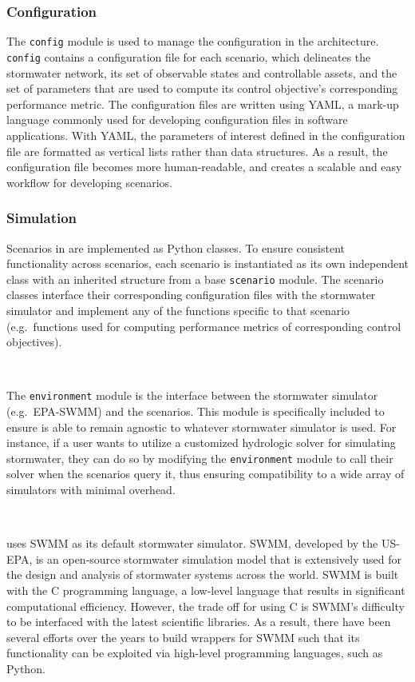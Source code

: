 \subsubsection{Configuration}
%
%
%
The \texttt{config} module is used to manage the configuration in the \pystorms architecture. \texttt{config} contains a configuration file for each scenario, which delineates the stormwater network, its set of observable states and controllable assets, and the set of parameters that are used to compute its control objective's corresponding performance metric. The configuration files are written using YAML, a mark-up language commonly used for developing configuration files in software applications. With YAML, the parameters of interest defined in the configuration file are formatted as vertical lists rather than data structures. As a result, the configuration file becomes more human-readable, and creates a scalable and easy workflow for developing scenarios. 
%
%
%
\subsubsection{Simulation}
%
%
%
Scenarios in \pystorms are implemented as Python classes. To ensure consistent functionality across scenarios, each scenario is instantiated as its own independent class with an inherited structure from a base \texttt{scenario} module. The scenario classes interface their corresponding configuration files with the stormwater simulator and implement any of the functions specific to that scenario (e.g.\ functions used for computing performance metrics of corresponding control objectives).

\

The \texttt{environment} module is the interface between the stormwater simulator (e.g.\ EPA-SWMM) and the scenarios. This module is specifically included to ensure \pystorms is able to remain agnostic to whatever stormwater simulator is used. For instance, if a user wants to utilize a customized hydrologic solver for simulating stormwater, they can do so by modifying the \texttt{environment} module to call their solver when the scenarios query it, thus ensuring compatibility to a wide array of simulators with minimal overhead. 

\

\pystorms uses SWMM as its default stormwater simulator. SWMM, developed by the US-EPA, is an open-source stormwater simulation model that is extensively used for the design and analysis of stormwater systems across the world. SWMM is built with the C programming language, a low-level language that results in significant computational efficiency. However, the trade off for using C is SWMM's difficulty to be interfaced with the latest scientific libraries. As a result, there have been several efforts over the years to build wrappers for SWMM such that its functionality can be exploited via high-level programming languages, such as Python.  

